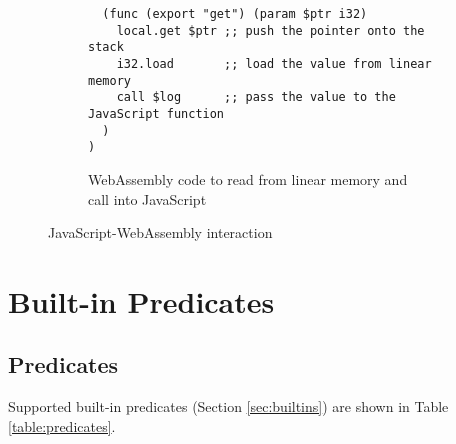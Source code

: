 \begin{appendices}
\begin{figure}[H]
\begin{subfigure}{\textwidth}
\begin{verbatim}
  (func (export "get") (param $ptr i32)
    local.get $ptr ;; push the pointer onto the stack
    i32.load       ;; load the value from linear memory
    call $log      ;; pass the value to the JavaScript function
  )
)
\end{verbatim}
\caption{WebAssembly code to read from linear memory and call into JavaScript}
\end{subfigure}
\caption{JavaScript-WebAssembly interaction}
\label{fig:js-wasm}
\end{figure}

\chapter{Built-in Predicates}

\label{appendix:predicates}

\section{Predicates}

Supported built-in predicates (Section \ref{sec:builtins}) are shown in Table \ref{table:predicates}.


\end{appendices}
